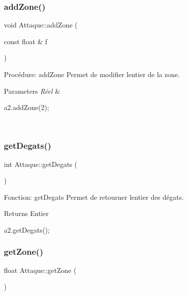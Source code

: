 \subsubsection{\texorpdfstring{add\+Zone()}{addZone()}}
{\footnotesize\ttfamily void Attaque\+::add\+Zone (\begin{DoxyParamCaption}\item[{const float \&}]{f }\end{DoxyParamCaption})}



Procédure\+: add\+Zone Permet de modifier l\textquotesingle{}entier de la zone. 


\begin{DoxyParams}{Parameters}
{\em Réel} & 
\begin{DoxyCode}
a2.addZone(2);
\end{DoxyCode}
 \\
\hline
\end{DoxyParams}
\mbox{\label{classAttaque_a56856e2880988e4cf9b051d32ca427a3}} 
\subsubsection{\texorpdfstring{get\+Degats()}{getDegats()}}
{\footnotesize\ttfamily int Attaque\+::get\+Degats (\begin{DoxyParamCaption}{ }\end{DoxyParamCaption})}



Fonction\+: get\+Degats Permet de retourner l\textquotesingle{}entier des dégats. 

\begin{DoxyReturn}{Returns}
Entier 
\begin{DoxyCode}
a2.getDegats();
\end{DoxyCode}
 
\end{DoxyReturn}
\mbox{\label{classAttaque_a84b1813598ac33dfcb76652d7ad4ebd4}} 
\subsubsection{\texorpdfstring{get\+Zone()}{getZone()}}
{\footnotesize\ttfamily float Attaque\+::get\+Zone (\begin{DoxyParamCaption}{ }\end{DoxyParamCaption})}



